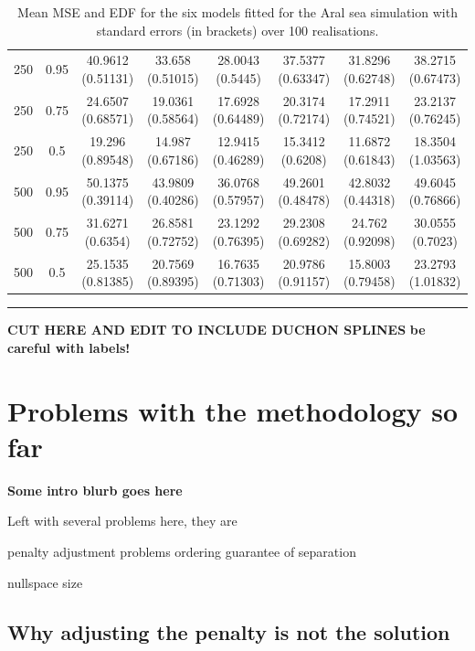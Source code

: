 {\begin{table}
\begin{tabular}{c c c c c c c c}
250  &  0.95  & 40.9612 (0.51131) & 33.658 (0.51015) & 28.0043 (0.5445) & 37.5377 (0.63347) & 31.8296 (0.62748) & 38.2715 (0.67473) \\ 
250  &  0.75  & 24.6507 (0.68571) & 19.0361 (0.58564) & 17.6928 (0.64489) & 20.3174 (0.72174) & 17.2911 (0.74521) & 23.2137 (0.76245) \\ 
250  &  0.5  & 19.296 (0.89548) & 14.987 (0.67186) & 12.9415 (0.46289) & 15.3412 (0.6208) & 11.6872 (0.61843) & 18.3504 (1.03563) \\ 
500  &  0.95  & 50.1375 (0.39114) & 43.9809 (0.40286) & 36.0768 (0.57957) & 49.2601 (0.48478) & 42.8032 (0.44318) & 49.6045 (0.76866) \\ 
500  &  0.75  & 31.6271 (0.6354) & 26.8581 (0.72752) & 23.1292 (0.76395) & 29.2308 (0.69282) & 24.762 (0.92098) & 30.0555 (0.7023) \\ 
500  &  0.5  & 25.1535 (0.81385) & 20.7569 (0.89395) & 16.7635 (0.71303) & 20.9786 (0.91157) & 15.8003 (0.79458) & 23.2793 (1.01832) \\ 
\end{tabular}
\caption{Mean MSE and EDF for the six models fitted for the Aral sea simulation with standard errors (in brackets) over 100 realisations.}
\label{bigaralresultstable}
\end{table}





\rule{6in}{1pt}
\begin{center}
\textbf{CUT HERE AND EDIT TO INCLUDE DUCHON SPLINES}
\textbf{be careful with labels!}
\end{center}

\section{Problems with the methodology so far}
\label{mds-problems}

\textbf{Some intro blurb goes here}

Left with several problems here, they are

penalty adjustment problems
	ordering
	guarantee of separation

nullspace size



\subsection{Why adjusting the penalty is not the solution}
\label{pensuck}

}
